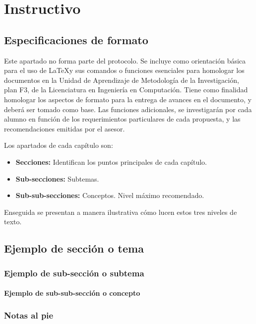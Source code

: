 \chapter{Instructivo}

\section{Especificaciones de formato}

Este apartado no forma parte del protocolo. Se incluye como orientación básica para el uso de \LaTeX y sus comandos o funciones esenciales para homologar los documentos en la Unidad de Aprendizaje de Metodología de la Investigación, plan F3, de la Licenciatura en Ingeniería en Computación. Tiene como finalidad homologar los aspectos de formato para la entrega de avances en el documento, y deberá ser tomado como base. Las funciones adicionales, se investigarán por cada alumno en función de los requerimientos particulares de cada propuesta, y las recomendaciones emitidas por el asesor.

Los apartados de cada capítulo son:

\begin{itemize}
	\item \textbf{Secciones:} Identifican los puntos principales de cada capítulo.
	\item \textbf{Sub-secciones:} Subtemas.
	\item \textbf{Sub-sub-secciones:} Conceptos. Nivel máximo recomendado. 	
\end{itemize}

Enseguida se presentan a manera ilustrativa cómo lucen estos tres niveles de texto. 

\section{Ejemplo de sección o tema}
\subsection{Ejemplo de sub-sección o subtema}
\subsubsection{Ejemplo de sub-sub-sección o concepto} 

\subsection{Notas al pie}

